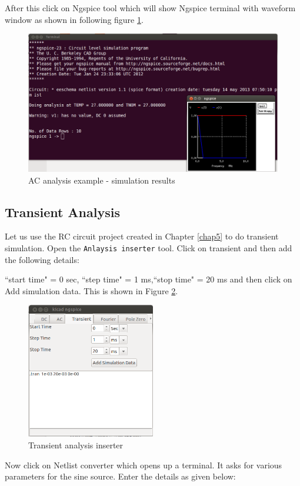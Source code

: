 After this click on Ngspice tool which will show Ngspice terminal with waveform window as shown in following figure \ref{17}.
\begin{figure}[t]
\centering
\includegraphics[width=\textwidth]{figures/17}
\caption{AC analysis example - simulation results}
\label{17}
\end{figure}
\subsection{Transient Analysis}
Let us use the RC circuit project created in Chapter \ref{chap5} to do transient simulation. Open the {\tt Anlaysis inserter} tool.
Click on transient and then add the following details:

``start time" = 0 sec, ``step time" = 1 ms,``stop time" = 20 ms and then click on Add simulation data. This is shown in Figure \ref{18}.
\begin{figure}[t]
\centering
\includegraphics[width=0.5\textwidth]{figures/18}
\caption{Transient analysis inserter}
\label{18}
\end{figure}
Now click on Netlist converter which opens up a terminal. It asks for various parameters for the sine source. Enter the details as given below:

